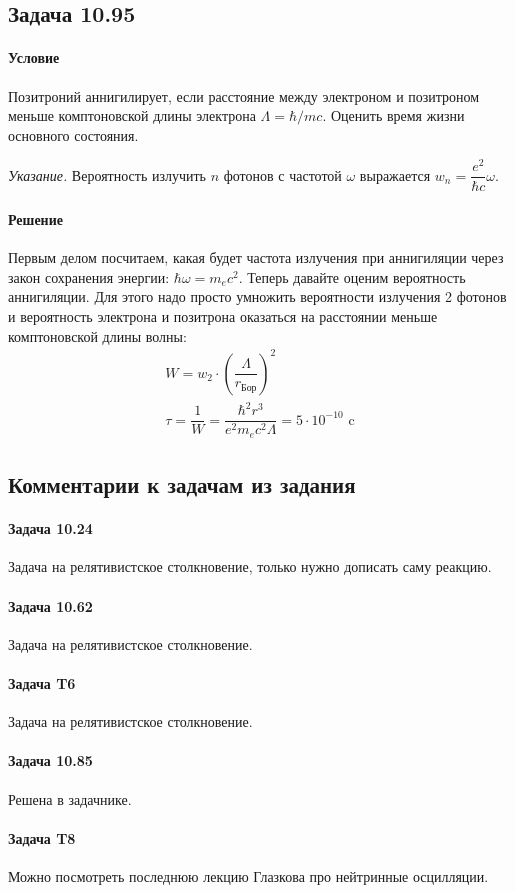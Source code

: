 \documentclass[12pt]{article}
\begin{document}
\subsection{Задача 10.95}
\label{task_10.95}
\paragraph{Условие}
Позитроний аннигилирует, если расстояние между электроном и позитроном меньше комптоновской длины электрона $\Lambda = \hbar/mc$. Оценить время жизни основного состояния.

\vspace{0.5em} \noindent
\textit{Указание.} Вероятность излучить $n$ фотонов с частотой $\omega$ выражается $w_n = \dfrac{e^2}{\hbar c} \omega$.
\paragraph{Решение}
Первым делом посчитаем, какая будет частота излучения при аннигиляции через закон сохранения энергии: $\hbar \omega = m_ec^2$. Теперь давайте оценим вероятность аннигиляции. Для этого надо просто умножить вероятности излучения 2 фотонов и вероятность электрона и позитрона оказаться на расстоянии меньше комптоновской длины волны:
\begin{gather*}
    W = w_2 \cdot \left(\dfrac{\Lambda}{r_{\text{Бор}}}\right)^2\\
    \tau = \dfrac{1}{W} = \dfrac{\hbar^2 r^3}{e^2 m_ec^2 \Lambda} = 5\cdot 10^{-10} \text{ c}
\end{gather*}


\subsection{Комментарии к задачам из задания}
\paragraph{Задача 10.24} Задача на релятивистское столкновение, только нужно дописать саму реакцию.
\paragraph{Задача 10.62}  Задача на релятивистское столкновение.
\paragraph{Задача T6} Задача на релятивистское столкновение.
\paragraph{Задача 10.85} Решена в задачнике.
\paragraph{Задача T8} Можно посмотреть последнюю лекцию Глазкова про нейтринные осцилляции.
\end{document}
